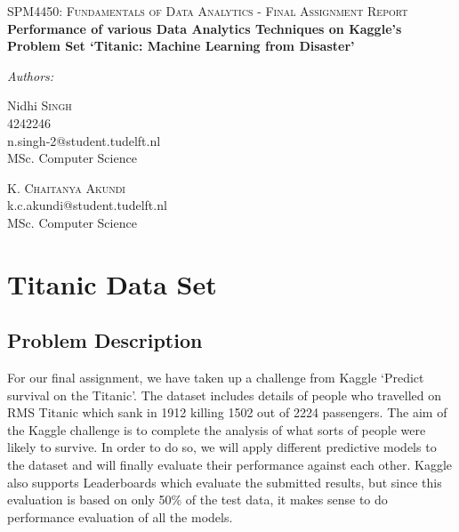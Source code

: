 \documentclass[a4paper,10pt]{report}\usepackage[]{graphicx}\usepackage[]{color}
\date{\today}
\begin{document}
\begin{titlepage}
\begin{center}

\textsc{\Large SPM4450: Fundamentals of Data Analytics - Final Assignment Report }\\[6cm]

{ \bfseries \Large Performance of various Data Analytics Techniques on Kaggle's Problem Set `Titanic: Machine Learning from Disaster' \\[6cm] }

\begin{minipage}{0.6\textwidth}
\emph{Authors:}\\
\begin{flushleft} \large
Nidhi \textsc{Singh}\\
4242246 \\
n.singh-2@student.tudelft.nl\\
MSc. Computer Science\\
\end{flushleft}

\begin{flushright} \large
K. \textsc{Chaitanya Akundi}\\
k.c.akundi@student.tudelft.nl\\
MSc. Computer Science\\
\end{flushright}

\end{minipage}

\end{center}
\end{titlepage}

\listoffigures

\chapter{Titanic Data Set}
\section{Problem Description}
For our final assignment, we have taken up a challenge from Kaggle `Predict survival on the Titanic'. The dataset includes details of people who travelled on RMS Titanic which sank in 1912 killing 1502 out of 2224 passengers.
The aim of the Kaggle challenge is to complete the analysis of what sorts of people were likely to survive. In order to do so, we will apply different predictive models to the dataset and will finally evaluate their performance against each other. Kaggle also supports Leaderboards which evaluate the submitted results, but since this evaluation is based on only 50\% of the test data, it makes sense to do performance evaluation of all the models.
\end{document}
